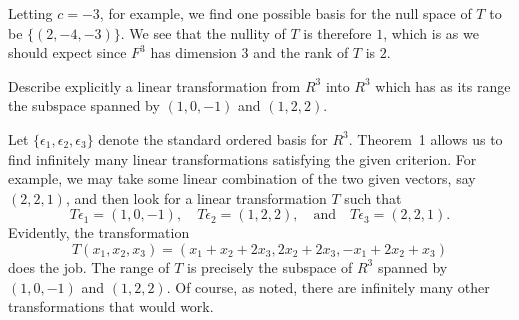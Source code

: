 \begin{enumerate}
\begin{solution}
    Letting $c = -3$, for example, we find one possible basis for the
    null space of $T$ to be $\{(2, -4, -3)\}$. We see that the nullity
    of $T$ is therefore $1$, which is as we should expect since $F^3$
    has dimension $3$ and the rank of $T$ is $2$.
  \end{solution}
\end{enumerate}

 Describe explicitly a linear transformation from $R^3$ into
$R^3$ which has as its range the subspace spanned by $(1, 0, -1)$ and
$(1, 2, 2)$.
\begin{solution}
  Let $\{\epsilon_1, \epsilon_2, \epsilon_3\}$ denote the standard
  ordered basis for $R^3$. Theorem~1 allows us to find infinitely many
  linear transformations satisfying the given criterion. For example,
  we may take some linear combination of the two given vectors, say
  $(2, 2, 1)$, and then look for a linear transformation $T$ such
  that
  \begin{equation*}
    T\epsilon_1 = (1, 0, -1),
    \quad
    T\epsilon_2 = (1, 2, 2),
    \quad\text{and}\quad
    T\epsilon_3 = (2, 2, 1).
  \end{equation*}
  Evidently, the transformation
  \begin{equation*}
    T(x_1, x_2, x_3) =
    (x_1 + x_2 + 2x_3, 2x_2 + 2x_3, -x_1 + 2x_2 + x_3)
  \end{equation*}
  does the job. The range of $T$ is precisely the subspace of $R^3$
  spanned by $(1, 0, -1)$ and $(1, 2, 2)$. Of course, as noted, there
  are infinitely many other transformations that would work.
\end{solution}
